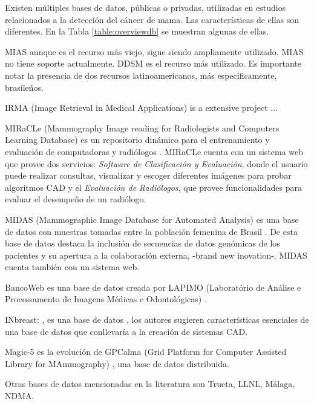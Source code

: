 Existen múltiples bases de datos, públicas o privadas, utilizadas en estudios
relacionados a la detección del cáncer de mama. Las características de ellas
son diferentes. En la Tabla \ref{table:overviewdb} se muestran algunas de ellas.

MIAS \cite{sucklingmini} aunque es el recurso más viejo, sigue siendo
ampliamente utilizado. MIAS no tiene soporte actualmente. DDSM
\cite{heath2000digital} es el recurso más utilizado. Es importante notar la
presencia de dos recursos latinoamericanos, más específicamente, brasileños.

IRMA (Image Retrieval in Medical Applications) is a extensive project
\cite{doi:10.1117/12.770325} ...

MIRaCLe (Mammography Image reading for Radiologists and Computers Learning
Database) es un repositorio dinámico para el entrenamiento y evaluación de
computadoras y radiólogos \cite{antoniou2009web}. MIRaCLe cuenta con un sistema
web que provee dos servicios: \textit{Software de Clasificación y Evaluación},
donde el usuario puede realizar consultas, visualizar y escoger diferentes
imágenes para probar algoritmos CAD y el \textit{Evaluación de Radiólogos}, que
provee funcionalidades para evaluar el desempeño de un radiólogo.

MIDAS (Mammographic Image Database for Automated Analysis) es una base de datos
con muestras tomadas entre la población femenina de Brasil
\cite{fernandes2012midas}. De esta base de datos destaca la inclusión de
secuencias de datos genómicas de los pacientes y su apertura a la colaboración
externa, -brand new inovation-. MIDAS cuenta también con un sistema web.

BancoWeb es una base de datos creada por LAPIMO (Laboratório de Análise e
Processamento de Imagens Médicas e Odontológicas) \cite{matheus2011online}.

INbreast: \cite{moreira2012inbreast}, es una base de datos , los autores
sugieren características esenciales de una base de datos que conllevaría a la
creación de sistemas CAD.

Magic-5 \cite{bellotti2004magic} es la evolución de GPCalma (Grid Platform for
Computer Assisted Library for MAmmography) \cite{lauria2006gpcalma}, una base
de datos distribuida. 

Otras bases de datos mencionadas en la literatura son Trueta, LLNL, Málaga,
NDMA.

